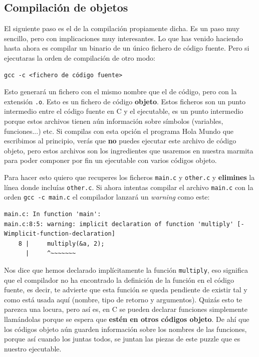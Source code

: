 \documentclass[a4paper]{article}
\begin{document}
\subsection{Compilación de objetos}
El siguiente paso es el de la compilación propiamente dicha. Es un paso
muy sencillo, pero con implicaciones muy interesantes. Lo que has venido
haciendo hasta ahora es compilar un binario de un único fichero de código
fuente. Pero si ejecutaras la orden de compilación de otro modo:
\begin{verbatim}
gcc -c <fichero de código fuente>
\end{verbatim}

Esto generará un fichero con el mismo nombre que el de código, pero con la
extensión \verb!.o!. Esto es un fichero de código \textbf{objeto}. Estos
ficheros son un punto intermedio entre el código fuente en C y el ejecutable,
es un punto intermedio porque estos archivos tienen aún información sobre
símbolos (variables, funciones...) etc. Si compilas con esta opción el programa
Hola Mundo que escribimos al principio, verás que \textbf{no} puedes ejecutar
este archivo de código objeto, pero estos archivos son los ingredientes que
usaremos en nuestra marmita para poder componer por fin un ejecutable con
varios códigos objeto.

Para hacer esto quiero que recuperes los ficheros \verb!main.c! y \verb!other.c!
y \textbf{elimines} la línea donde incluías \verb!other.c!. Si ahora intentas
compilar el archivo \verb!main.c! con la orden
\verb!gcc -c main.c! el compilador lanzará un \emph{warning} como este:

\begin{lstlisting}[style=terminalStyle]
main.c: In function 'main':
main.c:8:5: warning: implicit declaration of function 'multiply' [-Wimplicit-function-declaration]
    8 |     multiply(&a, 2);
      |     ^~~~~~~~
\end{lstlisting}

Nos dice que hemos declarado implícitamente la función \verb!multiply!, eso
significa que el compilador no ha encontrado la definición de la función en el
código fuente, es decir, te advierte que esta función se queda pendiente de
existir tal y como está usada aquí (nombre, tipo de retorno y argumentos).
Quizás esto te parezca una locura, pero así es, en C se pueden declarar
funciones simplemente llamándolas porque se espera que \textbf{estén en otros
códigos objeto}. De ahí que los códigos objeto aún guarden información sobre
los nombres de las funciones, porque así cuando los juntas todos, se juntan
las piezas de este puzzle que es nuestro ejecutable.
\end{document}
